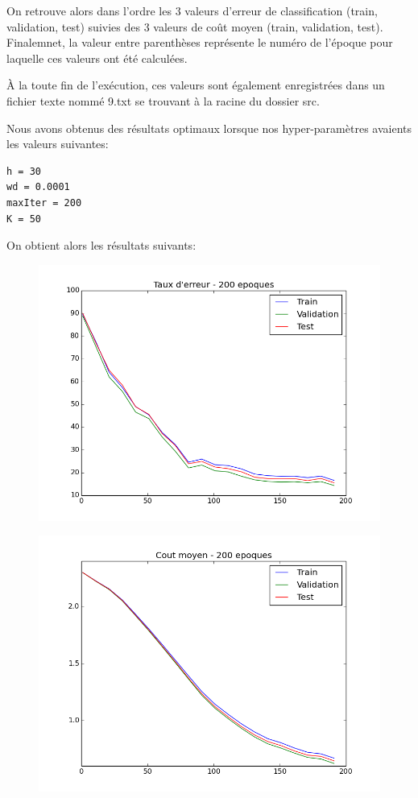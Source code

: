 \documentclass[a4paper,11pt]{article}
\begin{document}
On retrouve alors dans l'ordre les 3 valeurs d'erreur de classification (train, validation, test) suivies des 3 valeurs de coût moyen (train, validation, test). Finalemnet, la valeur entre parenthèses représente le numéro de l'époque pour laquelle ces valeurs ont été calculées.

À la toute fin de l'exécution, ces valeurs sont également enregistrées dans un fichier texte nommé 9.txt se trouvant à la racine du dossier src.

\newpage

Nous avons obtenus des résultats optimaux lorsque nos hyper-paramètres avaients les valeurs suivantes:

\begin{verbatim}
h = 30
wd = 0.0001
maxIter = 200
K = 50
\end{verbatim}

On obtient alors les résultats suivants:

\begin{figure}[H]
	\includegraphics[width=15cm]{images/best_taux_erreur.png}
	\centering
	\label{fig:comp}
\end{figure}

\begin{figure}[H]
	\includegraphics[width=15cm]{images/best_cout_moyen.png}
	\centering
	\label{fig:comp}
\end{figure}
\end{document}
